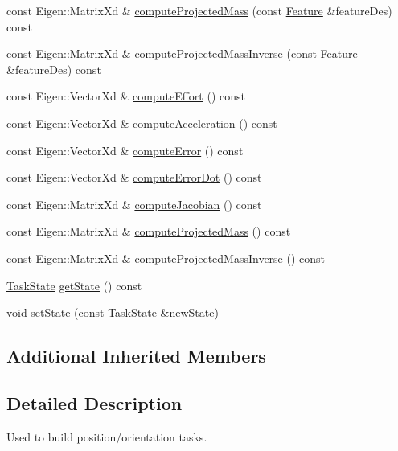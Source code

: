 \begin{DoxyCompactItemize}
const Eigen\+::\+Matrix\+Xd \& \hyperlink{classocra_1_1DisplacementFeature_ada8c4f0d41fcd152730ee4affef4f470}{compute\+Projected\+Mass} (const \hyperlink{classocra_1_1Feature}{Feature} \&feature\+Des) const 
\item 
const Eigen\+::\+Matrix\+Xd \& \hyperlink{classocra_1_1DisplacementFeature_a21c39859f0daca89d4afc6c747b5a962}{compute\+Projected\+Mass\+Inverse} (const \hyperlink{classocra_1_1Feature}{Feature} \&feature\+Des) const 
\item 
const Eigen\+::\+Vector\+Xd \& \hyperlink{classocra_1_1DisplacementFeature_a73206de5868279ef166e61a602399225}{compute\+Effort} () const 
\item 
const Eigen\+::\+Vector\+Xd \& \hyperlink{classocra_1_1DisplacementFeature_a717cb673e9e6c00addec68556918dce7}{compute\+Acceleration} () const 
\item 
const Eigen\+::\+Vector\+Xd \& \hyperlink{classocra_1_1DisplacementFeature_ab44157f66f65ae93cc4b7fe9b72de1af}{compute\+Error} () const 
\item 
const Eigen\+::\+Vector\+Xd \& \hyperlink{classocra_1_1DisplacementFeature_ab91d78fcf284bd6ab8e9562f95314719}{compute\+Error\+Dot} () const 
\item 
const Eigen\+::\+Matrix\+Xd \& \hyperlink{classocra_1_1DisplacementFeature_ac2b83c2f6f18f8fbe00aa1b26e3ec2b8}{compute\+Jacobian} () const 
\item 
const Eigen\+::\+Matrix\+Xd \& \hyperlink{classocra_1_1DisplacementFeature_a96953044d155fe2cd36a7bc588a06f6b}{compute\+Projected\+Mass} () const 
\item 
const Eigen\+::\+Matrix\+Xd \& \hyperlink{classocra_1_1DisplacementFeature_aa675f33adfdae92e1373e52c55a7dd68}{compute\+Projected\+Mass\+Inverse} () const 
\item 
\hyperlink{classocra_1_1TaskState}{Task\+State} \hyperlink{classocra_1_1DisplacementFeature_ad034ee4e39ae19f81b8d85d2f807c67c}{get\+State} () const 
\item 
void \hyperlink{classocra_1_1DisplacementFeature_a7a99c7e57d512ec2d6094fc10388e033}{set\+State} (const \hyperlink{classocra_1_1TaskState}{Task\+State} \&new\+State)
\end{DoxyCompactItemize}
\subsection*{Additional Inherited Members}


\subsection{Detailed Description}
Used to build position/orientation tasks. 

